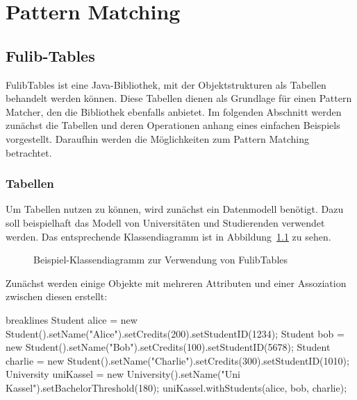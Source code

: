 \chapter{Pattern Matching}\label{ch:pattern-matching}


\section{Fulib-Tables}\label{sec:fulib-tables}

FulibTables\cite{fulibTables} ist eine Java-Bibliothek, mit der Objektstrukturen als Tabellen behandelt werden können.
Diese Tabellen dienen als Grundlage für einen Pattern Matcher, den die Bibliothek ebenfalls anbietet.
Im folgenden Abschnitt werden zunächst die Tabellen und deren Operationen anhang eines einfachen Beispiels vorgestellt.
Daraufhin werden die Möglichkeiten zum Pattern Matching betrachtet.

\subsection{Tabellen}\label{subsec:tables}

Um Tabellen nutzen zu können, wird zunächst ein Datenmodell benötigt.
Dazu soll beispielhaft das Modell von Universitäten und Studierenden verwendet werden.
Das entsprechende Klassendiagramm ist in Abbildung~\ref{fig:table-example-class-diagram} zu sehen.

\begin{figure}
    \caption{Beispiel-Klassendiagramm zur Verwendung von FulibTables}
    \label{fig:table-example-class-diagram}
\end{figure}

Zunächst werden einige Objekte mit mehreren Attributen und einer Assoziation zwischen diesen erstellt:

\begin{jcodeblock*}{breaklines}
    Student alice = new Student().setName("Alice").setCredits(200).setStudentID(1234);
    Student bob = new Student().setName("Bob").setCredits(100).setStudentID(5678);
    Student charlie = new Student().setName("Charlie").setCredits(300).setStudentID(1010);
    University uniKassel = new University().setName("Uni Kassel").setBachelorThreshold(180);
    uniKassel.withStudents(alice, bob, charlie);
\end{jcodeblock*}


